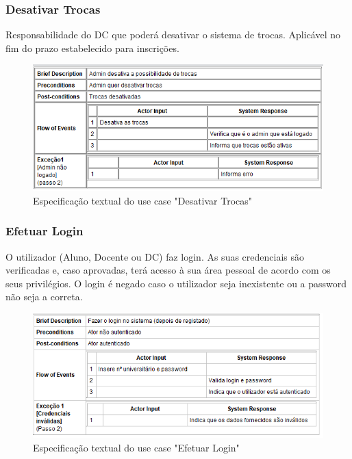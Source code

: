\documentclass[a4paper]{article}
\begin{document}
\clearpage
\subsubsection{Desativar Trocas}
\hspace{3mm}Responsabilidade do DC que poderá desativar o sistema de trocas. Aplicável no fim do prazo estabelecido para inscrições.

\begin{figure}[H]
\centering
\includegraphics[width=14cm]{UCDesativarTrocas}
\caption{Especificação textual do use case "Desativar Trocas"}
\label{}
\end{figure}

\subsubsection{Efetuar Login}
\hspace{3mm}O utilizador (Aluno, Docente ou DC) faz login. As suas credenciais são verificadas e, caso aprovadas, terá acesso à sua área pessoal de acordo com os seus privilégios. O login é negado caso o utilizador seja inexistente ou a password não seja a correta.

\begin{figure}[H]
\centering
\includegraphics[width=14cm]{UCEfetuarLogin}
\caption{Especificação textual do use case "Efetuar Login"}
\label{}
\end{figure}
\end{document}
